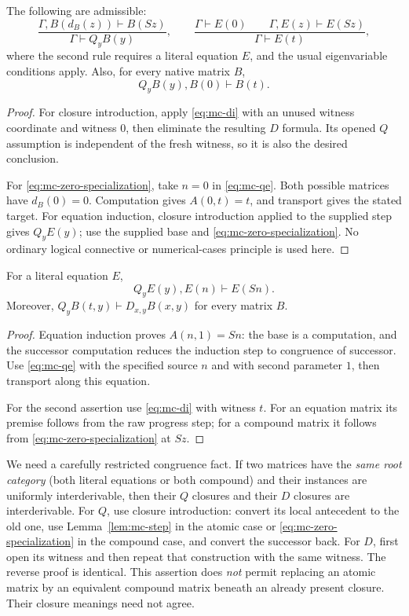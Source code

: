 \begin{lemma}
\label{lem:mc-ei}
The following are admissible:
\[
 \frac{\Gamma,B(d_B(z))\vdash B(Sz)}{\Gamma\vdash Q_yB(y)},
 \qquad
 \frac{\Gamma\vdash E(0)\qquad\Gamma,E(z)\vdash E(Sz)}
      {\Gamma\vdash E(t)},
\]
where the second rule requires a literal equation $E$, and the usual
eigenvariable conditions apply.  Also, for every native matrix $B$,
\[
 Q_yB(y),B(0)\vdash B(t).
 \tag{MC7}\label{eq:mc-zero-specialization}
\]
\end{lemma}
\begin{proof}
For closure introduction, apply \eqref{eq:mc-di} with an unused witness
coordinate and witness $0$, then eliminate the resulting $D$ formula.
Its opened $Q$ assumption is independent of the fresh witness, so it
is also the desired conclusion.

For \eqref{eq:mc-zero-specialization}, take $n=0$ in
\eqref{eq:mc-qe}.  Both possible matrices have $d_B(0)=0$.
Computation gives $A(0,t)=t$, and transport gives the stated target.
For equation induction, closure introduction applied to the supplied
step gives $Q_yE(y)$; use the supplied base and
\eqref{eq:mc-zero-specialization}.  No ordinary logical connective
or numerical-cases principle is used here.
\end{proof}

\begin{lemma}
\label{lem:mc-step}
For a literal equation $E$,
\[
 Q_yE(y),E(n)\vdash E(Sn).
\]
Moreover, $Q_yB(t,y)\vdash D_{x,y}B(x,y)$ for every matrix $B$.
\end{lemma}
\begin{proof}
Equation induction proves $A(n,1)=Sn$: the base is a computation,
and the successor computation reduces the induction step to congruence
of successor.  Use \eqref{eq:mc-qe} with the specified source $n$ and
with second parameter $1$, then transport along this equation.

For the second assertion use \eqref{eq:mc-di} with witness $t$.
For an equation matrix its premise follows from the raw progress step;
for a compound matrix it follows from
\eqref{eq:mc-zero-specialization} at $Sz$.
\end{proof}

We need a carefully restricted congruence fact.  If two matrices have
the \emph{same root category} (both literal equations or both compound)
and their instances are uniformly interderivable, then their $Q$
closures and their $D$ closures are interderivable.  For $Q$, use
closure introduction: convert its local antecedent to the old one,
use Lemma~\ref{lem:mc-step} in the atomic case or
\eqref{eq:mc-zero-specialization} in the compound case, and convert
the successor back.  For $D$, first open its witness and then repeat
that construction with the same witness.  The reverse proof is identical.
This assertion does \emph{not} permit replacing an atomic matrix by
an equivalent compound matrix beneath an already present closure.
Their closure meanings need not agree.


